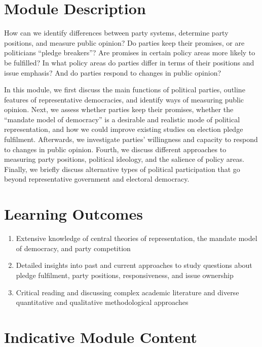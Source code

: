 \documentclass[abstract=on,parskip=full,headings=standardclasses,fontsize=11pt,paper=a4]{scrartcl}
\begin{document}
\section*{Module Description}

How can we identify differences between party systems, determine party positions, and measure public opinion? Do parties keep their promises, or are politicians ``pledge breakers''? Are promises in certain policy areas more likely to be fulfilled? In what policy areas do parties differ in terms of their positions and issue emphasis? And do parties respond to changes in public opinion?

In this module, we first discuss the main functions of political parties, outline features of representative democracies, and identify ways of measuring public opinion. Next, we assess whether parties keep their promises, whether the ``mandate model of democracy'' is a desirable and realistic mode of political representation, and how we could improve existing studies on election pledge fulfilment. Afterwards, we investigate parties' willingness and capacity to respond to changes in public opinion. Fourth, we discuss different approaches to measuring party positions, political ideology, and the salience of policy areas.  %
Finally, we briefly discuss alternative types of political participation that go beyond representative government and electoral democracy.




\section*{Learning Outcomes}

\begin{enumerate}
\item Extensive knowledge of central theories of representation,  the mandate model of democracy, and party competition
\item Detailed insights into past and current approaches to study questions about pledge fulfilment, party positions, responsiveness, and issue ownership 
\item Critical reading and discussing  complex academic literature and diverse  quantitative and qualitative methodological approaches
\end{enumerate}

\section*{Indicative Module Content}
\end{document}
